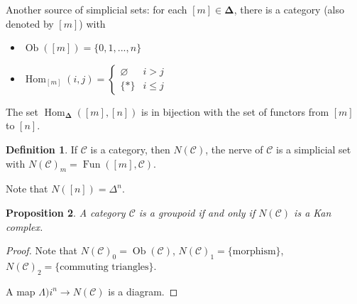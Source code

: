 \documentclass{article}
\theoremstyle{definition}
\newtheorem{defn}{Definition}[section]
\theoremstyle{remark}
\theoremstyle{plain}
\newtheorem{prop}[defn]{Proposition}
\newcommand{\Hom}{\operatorname{Hom}}
\newcommand{\bdel}{\mathbf{\Delta}}
\begin{document}
Another source of simplicial sets: for each $[m]\in\bdel$, there is a category (also denoted by $[m]$) with
\begin{itemize}
    \item $\operatorname{Ob}([m])=\{0,1,...,n\}$
    \item $\Hom_{[m]}(i,j)=\begin{cases}
        \varnothing & i>j\\ \{\ast\} & i\le j
    \end{cases}$
\end{itemize}
The set $\Hom_\bdel([m],[n])$ is in bijection with the set of functors from $[m]$ to $[n]$.

\begin{defn}
    If $\mathscr C$ is a category, then $N(\mathscr C)$, the nerve of $\mathscr C$ is a simplicial set with $N(\mathscr C)_m=\operatorname{Fun}([m],\mathscr C)$.
\end{defn}
Note that $N([n])=\Delta^n$.
\begin{prop}
    A category $\mathscr C$ is a groupoid if and only if $N(\mathscr C)$ is a Kan complex.
\end{prop}
\begin{proof}
    Note that $N(\mathscr C)_0=\operatorname{Ob}(\mathscr C)$, $N(\mathscr C)_1=\{\text{morphism}\}$, $N(\mathscr C)_2=\{\text{commuting triangles}\}$.

    A map $\Lambda)i^n\to N(\mathscr C)$ is a diagram.
\end{proof}
\end{document}
